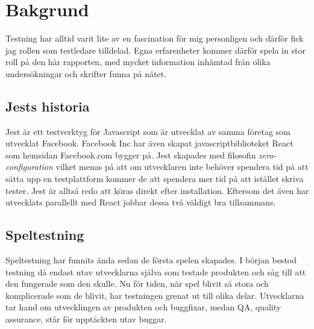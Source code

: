 \section{Bakgrund}
\label{sec:david-background}
Testning har alltid varit lite av en fascination för mig personligen och därför fick jag rollen som testledare tilldelad. Egna erfarenheter kommer därför spela in stor roll på den här rapporten, med mycket information inhämtad från olika undersökningar och skrifter funna på nätet.

\subsection{Jests historia}
Jest är ett testverktyg för Javascript som är utvecklat av samma företag som utvecklat Facebook. Facebook Inc har även skapat javascriptbiblioteket React\cite{bib-react} som hemsidan Facebook.com bygger på. Jest skapades med filosofin \textit{zero-configuration} vilket menas på att om utvecklaren inte behöver spendera tid på att sätta upp en testplattform kommer de att spendera mer tid på att istället skriva tester. Jest är alltså redo att köras direkt efter installation. Eftersom det även har utvecklats parallellt med React jobbar dessa två väldigt bra tillsammans.

\subsection{Speltestning}
Speltestning har funnits ända sedan de första spelen skapades. I början bestod testning då endast utav utvecklarna själva som testade produkten och såg till att den fungerade som den skulle. Nu för tiden, när spel blivit så stora och komplicerade som de blivit, har testningen grenat ut till olika delar. Utvecklarna tar hand om utvecklingen av produkten och buggfixar, medan QA, quality assurance, står för upptäckten utav buggar\cite{bib-quality-assured}. 